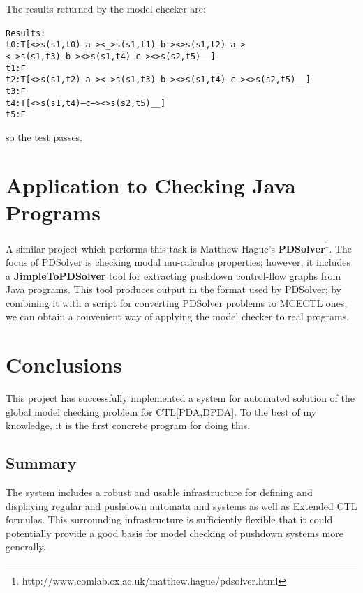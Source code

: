 \documentclass[11pt]{article}
\theoremstyle{definition}
\begin{document}
The results returned by the model checker are:
\footnotesize
\begin{alltt}
Results: {
   t0: T     [ <> s(s1,t0) --a--> <_> s(s1,t1) --b--> <> s(s1,t2) --a--> 
               <_> s(s1,t3) --b--> <> s(s1,t4) --c--> <> s(s2,t5)__ ]
   t1: F
   t2: T     [ <> s(s1,t2) --a--> <_> s(s1,t3) --b--> <> s(s1,t4) --c--> <> s(s2,t5)__ ]
   t3: F
   t4: T     [ <> s(s1,t4) --c--> <> s(s2,t5)__ ]
   t5: F
}
\end{alltt}
\normalsize
so the test passes.



\section{Application to Checking Java Programs}

A similar project which performs this task is Matthew Hague's
\textbf{PDSolver}\footnote{
http://www.comlab.ox.ac.uk/matthew.hague/pdsolver.html}\cite{hague2010analysing}.
The focus of PDSolver is checking modal mu-calculus properties; however, it
includes a \textbf{JimpleToPDSolver} tool for extracting pushdown control-flow
graphs from Java programs. This tool produces output in the format used by
PDSolver; by combining it with a script for converting PDSolver problems to
MCECTL ones, we can obtain a convenient way of applying the model checker to
real programs.

\section{Conclusions}

This project has successfully implemented a system for automated solution of
the global model checking problem for CTL[PDA,DPDA]. To the best of my
knowledge, it is the first concrete program for doing this.

\subsection{Summary}

The system includes a robust and usable infrastructure for defining and
displaying regular and pushdown automata and systems as well as Extended CTL
formulas.  This surrounding infrastructure is sufficiently flexible that it
could potentially provide a good basis for model checking of pushdown systems
more generally.
\end{document}

